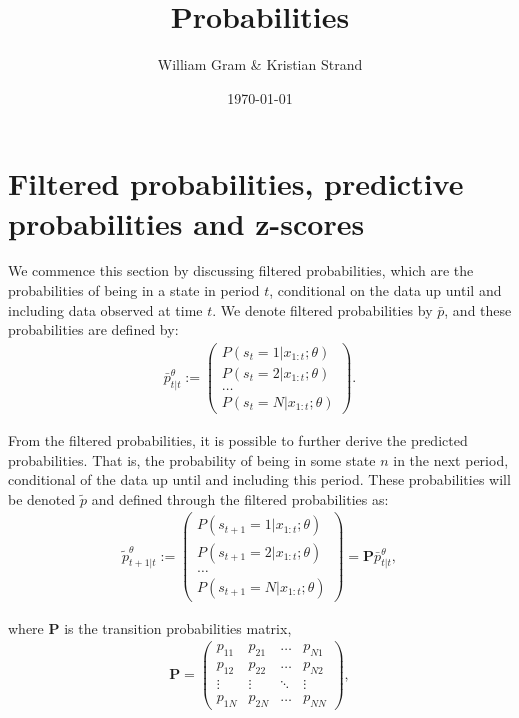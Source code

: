 \documentclass[11pt,a4paper,oneside]{article}
\title{Probabilities}
\author{William Gram \& Kristian Strand}
\date{\today}
\newcommand{\lp}{\left(}
\newcommand{\rp}{\right)}
\begin{document}
\rfoot{\thepage}
\setcounter{page}{1}

\section{Filtered probabilities, predictive probabilities and z-scores}
We commence this section by discussing filtered probabilities, which are the probabilities of being in a state in period $t$, conditional on the data up until and including data observed at time $t$. We denote filtered probabilities by $\bar p$, and these probabilities are defined by:
\begin{align} \label{eq:filtered_probs}
    \bar p_{t\vert t}^\theta :=
        \begin{pmatrix}
            P\lp s_t = 1\vert x_{1:t};\theta\rp \\
            P\lp s_t = 2\vert x_{1:t};\theta\rp \\
            \dots\\
            P\lp s_t = N\vert x_{1:t};\theta\rp
        \end{pmatrix}.
\end{align}

From the filtered probabilities, it is possible to further derive the predicted probabilities. That is, the probability of being in some state $n$ in the next period, conditional of the data up until and including this period. These probabilities will be denoted $\tilde p$ and defined through the filtered probabilities as:
\begin{align}\label{eq:predictive_probs}
    \tilde p_{t+1\vert t}^\theta :=
        \begin{pmatrix}
            P\lp s_{t+1} = 1\vert x_{1:t};\theta\rp \\
            P\lp s_{t+1} = 2\vert x_{1:t};\theta\rp \\
            \dots\\
            P\lp s_{t+1} = N\vert x_{1:t};\theta\rp
        \end{pmatrix}
            =
        \mathbf{P} \bar p_{t\vert t}^\theta,
\end{align}

where $\mathbf{P}$ is the transition probabilities matrix,
\begin{align*}
    \mathbf{P} = 
        \begin{pmatrix}
            p_{11} & p_{21} & \dots  & p_{N1} \\
            p_{12} & p_{22} & \dots  & p_{N2} \\
            \vdots & \vdots & \ddots & \vdots \\
            p_{1N} & p_{2N} & \dots  & p_{NN}
        \end{pmatrix},
\end{align*}
\end{document}
